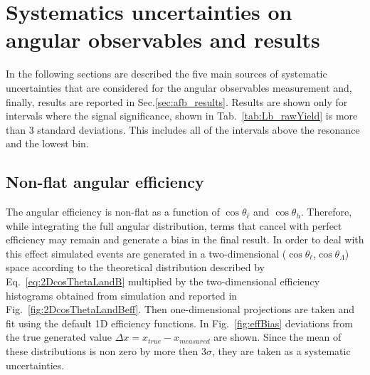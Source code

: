 \chapter{Systematics uncertainties on angular observables and results}

In the following sections are described the five main sources of systematic uncertainties
that are considered for the angular observables measurement and, finally, results are
reported in Sec.\ref{sec:afb_results}. Results are shown only for \qsq intervals
where the signal significance, shown in Tab.~\ref{tab:Lb_rawYield} is more than 3 standard
deviations. This includes all of the \qsq intervals above the \jpsi resonance and the lowest \qsq bin.



\section{Non-flat angular efficiency}

The angular efficiency is non-flat as a function of $\cos\theta_\ell$ and $\cos \theta_h$.
Therefore, while integrating the full angular distribution, terms that cancel with perfect efficiency
may remain and generate a bias in the final result. In order to deal with this effect simulated events are
generated in a two-dimensional ($\cos\theta_\ell$,$\cos \theta_\Lambda$) space according to the
theoretical distribution described by Eq.~\ref{eq:2DcosThetaLandB} multiplied by the two-dimensional efficiency
histograms obtained from simulation and reported in Fig.~\ref{fig:2DcosThetaLandBeff}.
Then one-dimensional projections are taken and fit using the default 1D efficiency functions.
In Fig.~\ref{fig:effBias} deviations from the true generated value $\Delta x = x_{true} - x_{measured}$ are shown.
Since the mean of these distributions is non zero by more then 3$\sigma$, they are taken as a systematic uncertainties.

